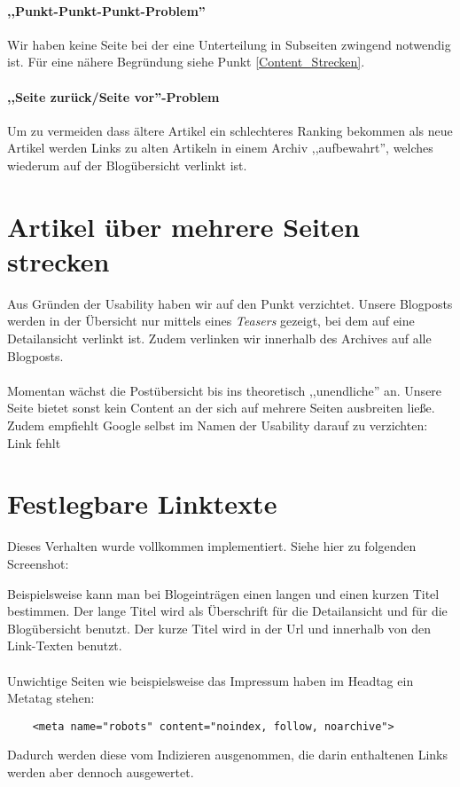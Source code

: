 \paragraph{,,Punkt-Punkt-Punkt-Problem''}
Wir haben keine Seite bei der eine Unterteilung in Subseiten zwingend notwendig
ist. Für eine nähere Begründung siehe Punkt \ref{Content_Strecken}.

\paragraph{,,Seite zurück/Seite vor''-Problem}
Um zu vermeiden dass ältere Artikel ein schlechteres Ranking bekommen als neue
Artikel werden Links zu alten Artikeln in einem Archiv ,,aufbewahrt'', welches
wiederum auf der Blogübersicht verlinkt ist.


\label{Content_Strecken}
\section{Artikel über mehrere Seiten strecken}
Aus Gründen der Usability haben wir auf den Punkt verzichtet. Unsere Blogposts
werden in der Übersicht nur mittels eines \emph{Teasers} gezeigt, bei dem auf
eine Detailansicht verlinkt ist. Zudem verlinken wir innerhalb des Archives auf
alle Blogposts. 
\\
\\
Momentan wächst die Postübersicht bis ins theoretisch ,,unendliche'' an.
Unsere Seite bietet sonst kein Content an der sich auf mehrere Seiten ausbreiten
ließe. Zudem empfiehlt Google selbst im Namen der Usability darauf zu
verzichten:
Link fehlt


\section{Festlegbare Linktexte}
Dieses Verhalten wurde vollkommen implementiert. Siehe hier  zu folgenden
Screenshot:

Beispielsweise kann man bei Blogeinträgen einen langen und einen kurzen Titel
bestimmen. Der lange Titel wird als Überschrift für die Detailansicht und für
die Blogübersicht benutzt. Der kurze Titel wird in der Url und innerhalb von den
Link-Texten benutzt. 
\\
\\
Unwichtige Seiten wie beispielsweise das Impressum haben im Headtag ein Metatag
stehen:
\begin{verbatim}
    <meta name="robots" content="noindex, follow, noarchive">
\end{verbatim}
Dadurch werden diese vom Indizieren ausgenommen, die darin enthaltenen Links
werden aber dennoch ausgewertet.

